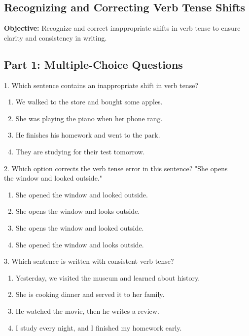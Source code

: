\documentclass[12pt]{article}
\begin{document}
\subsection*{Recognizing and Correcting Verb Tense Shifts}
\onehalfspacing

\begin{tcolorbox}[colframe=black!40, colback=gray!0, title=Learning Objective]
\textbf{Objective:} Recognize and correct inappropriate shifts in verb tense to ensure clarity and consistency in writing.
\end{tcolorbox}

\subsection*{Part 1: Multiple-Choice Questions}

1. Which sentence contains an inappropriate shift in verb tense?  
\begin{enumerate}[label=\Alph*.]
    \item We walked to the store and bought some apples.  
    \item She was playing the piano when her phone rang.  
    \item He finishes his homework and went to the park.  
    \item They are studying for their test tomorrow.  
\end{enumerate}

\vspace{1cm}

2. Which option corrects the verb tense error in this sentence?  
"She opens \\the window and looked outside."  
\begin{enumerate}[label=\Alph*.]
    \item She opened the window and looked outside.  
    \item She opens the window and looks outside.  
    \item She opens the window and looked outside.  
    \item She opened the window and looks outside.  
\end{enumerate}

\vspace{1cm}

3. Which sentence is written with consistent verb tense?  
\begin{enumerate}[label=\Alph*.]
    \item Yesterday, we visited the museum and learned about history.  
    \item She is cooking dinner and served it to her family.  
    \item He watched the movie, then he writes a review.  
    \item I study every night, and I finished my homework early.  
\end{enumerate}
\end{document}
